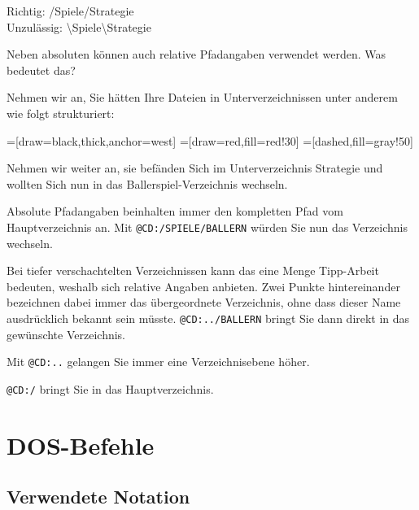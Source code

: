 \documentclass[10pt,a4paper]{scrartcl}		%
\begin{document}
Richtig: /Spiele/Strategie\\
Unzulässig: \textbackslash Spiele\textbackslash Strategie

Neben absoluten können auch relative Pfadangaben verwendet werden.
Was bedeutet das?

Nehmen wir an, Sie hätten Ihre Dateien 
in Unterverzeichnissen unter anderem wie folgt strukturiert:

=[draw=black,thick,anchor=west]
=[draw=red,fill=red!30]
=[dashed,fill=gray!50]

Nehmen wir weiter an, sie befänden Sich im Unterverzeichnis Strategie
und wollten Sich nun in das Ballerspiel-Verzeichnis wechseln.

Absolute Pfadangaben beinhalten immer den kompletten Pfad vom
Hauptverzeichnis an. Mit \texttt{@CD:/SPIELE/BALLERN} würden Sie nun
das Verzeichnis wechseln.

Bei tiefer verschachtelten Verzeichnissen kann das eine Menge Tipp-Arbeit
bedeuten, weshalb sich relative Angaben anbieten. Zwei Punkte hintereinander
bezeichnen dabei immer das übergeordnete Verzeichnis, ohne dass
dieser Name ausdrücklich bekannt sein müsste. \texttt{@CD:../BALLERN}
bringt Sie dann direkt in das gewünschte Verzeichnis.

Mit \texttt{@CD:..} gelangen Sie immer eine Verzeichnisebene höher.

\texttt{@CD:/} bringt Sie in das Hauptverzeichnis.

\clearpage
\section{DOS-Befehle}
\subsection{Verwendete Notation}
\end{document}
